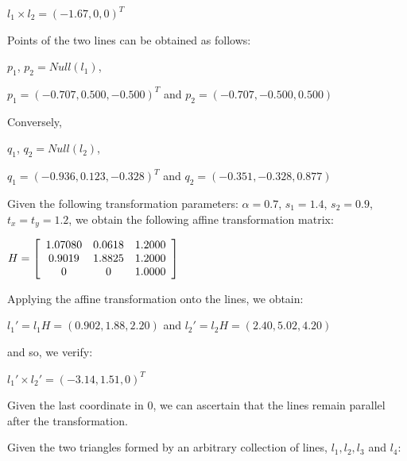 \documentclass[]{article}
\begin{document}
\centerline {
	$l_1 \times l_2 = (-1.67, 0, 0)^T$
}

\vspace{0.5em}
Points of the two lines can be obtained as follows:

\vspace{0.5em}

\centerline {
	$p_1$, $p_2 = Null(l_1)$, 
}

\vspace{0.5em}

\centerline {
	$p_1=(-0.707, 0.500, -0.500)^T$ and $p_2=(-0.707, -0.500, 0.500)$ 
}

\vspace{0.5em}

Conversely, 


\centerline {
	$q_1$, $q_2 = Null(l_2)$, 
}

\vspace{0.5em}

\centerline {
	$q_1=(-0.936, 0.123, -0.328)^T$ and $q_2=(-0.351, -0.328, 0.877)$ 
}

Given the following transformation parameters: $\alpha = 0.7$, $s_1=1.4$, $s_2=0.9$, $t_x=t_y=1.2$, we obtain the following affine transformation matrix:

\vspace{0.5em}

\centerline {
	$H = \left[ {\begin{array}{*{20}c}
		1.07080 & 0.0618 & 1.2000 \\
		0.9019 & 1.8825 & 1.2000 \\
		0 & 0 & 1.0000
		\end{array} } \right] $
}

\vspace{0.5em}

Applying the affine transformation onto the lines, we obtain:

\vspace{0.5em}

\centerline {
	$l_1' = l_1H = (0.902, 1.88, 2.20)$ and $l_2' = l_2H = (2.40, 5.02, 4.20)$ 
}

\vspace{0.5em}

and so, we verify:

\centerline {
	$l_1' \times l_2'=(-3.14, 1.51, 0)^T$
}

Given the last coordinate in 0, we can ascertain that the lines remain parallel after the transformation.

Given the two triangles formed by an arbitrary collection of lines, $l_1, l_2, l_3$ and $l_4$:
\end{document}
